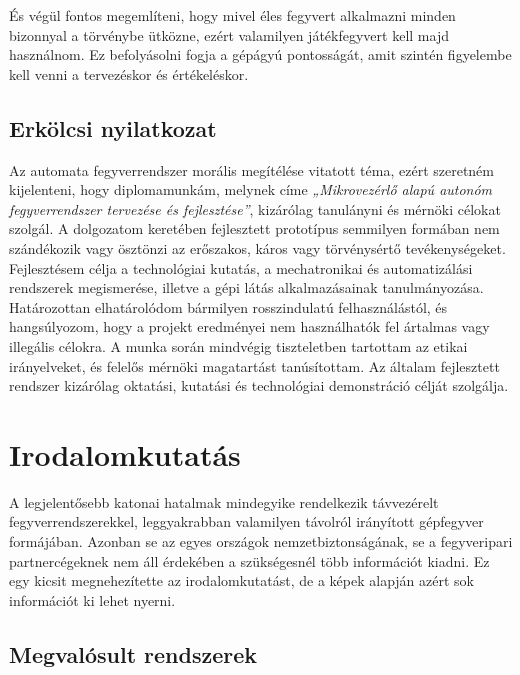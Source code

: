 \documentclass[12pt,a4paper]{article}
\begin{document}
És végül fontos megemlíteni, hogy mivel éles fegyvert alkalmazni minden bizonnyal a törvénybe ütközne, ezért valamilyen játékfegyvert kell majd használnom. Ez befolyásolni fogja a gépágyú pontosságát, amit szintén figyelembe kell venni a tervezéskor és értékeléskor.\\


\pagebreak

\subsection{Erkölcsi nyilatkozat}
Az automata fegyverrendszer morális megítélése vitatott téma, ezért szeretném kijelenteni, hogy diplomamunkám, melynek címe \textsl{„Mikrovezérlő alapú autonóm fegyverrendszer tervezése és fejlesztése”}, kizárólag tanulányni és mérnöki célokat szolgál. A dolgozatom keretében fejlesztett prototípus semmilyen formában nem szándékozik vagy ösztönzi az erőszakos, káros vagy törvénysértő tevékenységeket. Fejlesztésem célja a technológiai kutatás, a mechatronikai és automatizálási rendszerek megismerése, illetve a gépi látás alkalmazásainak tanulmányozása. \\

Határozottan elhatárolódom bármilyen rosszindulatú felhasználástól, és hangsúlyozom, hogy a projekt eredményei nem használhatók fel ártalmas vagy illegális célokra. A munka során mindvégig tiszteletben tartottam az etikai irányelveket, és felelős mérnöki magatartást tanúsítottam. Az általam fejlesztett rendszer kizárólag oktatási, kutatási és technológiai demonstráció célját szolgálja.

\pagebreak


\section{Irodalomkutatás}
A legjelentősebb katonai hatalmak mindegyike rendelkezik távvezérelt fegyverrendszerekkel, leggyakrabban valamilyen távolról irányított gépfegyver formájában. Azonban se az egyes országok nemzetbiztonságának, se a fegyveripari partnercégeknek nem áll érdekében a szükségesnél több információt kiadni. Ez egy kicsit megnehezítette az irodalomkutatást, de a képek alapján azért sok információt ki lehet nyerni.

\subsection{Megvalósult rendszerek} \label{sec:valos}
\end{document}
